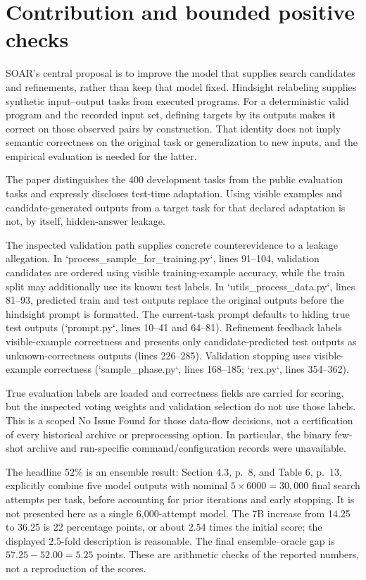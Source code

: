 \documentclass[10pt]{article}
\begin{document}
\section*{Contribution and bounded positive checks}
SOAR’s central proposal is to improve the model that supplies search candidates and refinements, rather than keep that model fixed. Hindsight relabeling supplies synthetic input–output tasks from executed programs. For a deterministic valid program and the recorded input set, defining targets by its outputs makes it correct on those observed pairs by construction. That identity does not imply semantic correctness on the original task or generalization to new inputs, and the empirical evaluation is needed for the latter.\par
The paper distinguishes the 400 development tasks from the public evaluation tasks and expressly discloses test-time adaptation. Using visible examples and candidate-generated outputs from a target task for that declared adaptation is not, by itself, hidden-answer leakage.\par
The inspected validation path supplies concrete counterevidence to a leakage allegation. In `process\_sample\_for\_training.py`, lines 91–104, validation candidates are ordered using visible training-example accuracy, while the train split may additionally use its known test labels. In `utils\_process\_data.py`, lines 81–93, predicted train and test outputs replace the original outputs before the hindsight prompt is formatted. The current-task prompt defaults to hiding true test outputs (`prompt.py`, lines 10–41 and 64–81). Refinement feedback labels visible-example correctness and presents only candidate-predicted test outputs as unknown-correctness outputs (lines 226–285). Validation stopping uses visible-example correctness (`sample\_phase.py`, lines 168–185; `rex.py`, lines 354–362).\par
True evaluation labels are loaded and correctness fields are carried for scoring, but the inspected voting weights and validation selection do not use those labels. This is a scoped No Issue Found for those data-flow decisions, not a certification of every historical archive or preprocessing option. In particular, the binary few-shot archive and run-specific command/configuration records were unavailable.\par
The headline 52\% is an ensemble result: Section 4.3, p. 8, and Table 6, p. 13, explicitly combine five model outputs with nominal \(5\times6000=30{,}000\) final search attempts per task, before accounting for prior iterations and early stopping. It is not presented here as a single 6,000-attempt model. The 7B increase from 14.25 to 36.25 is 22 percentage points, or about \(2.54\) times the initial score; the displayed \(2.5\)-fold description is reasonable. The final ensemble–oracle gap is \(57.25-52.00=5.25\) points. These are arithmetic checks of the reported numbers, not a reproduction of the scores.\par
\end{document}
